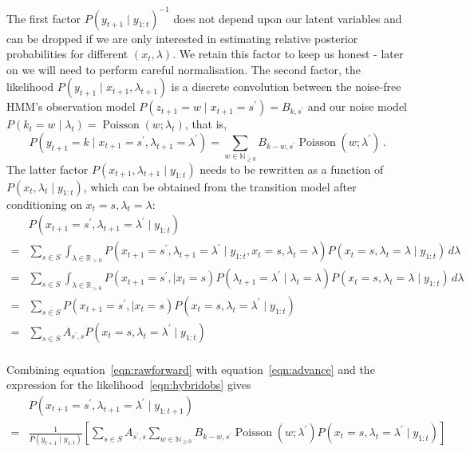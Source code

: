\documentclass[twoside, 11pt]{article}
\DeclareMathOperator*{\poissond}{Poisson}
\newcommand{\reals}[0] {\mathbb{R}}
\newcommand{\nonnegint}[0] {\mathbb{N}_{\geq 0}}
\begin{document}
The first factor $P(y_{t+1} \mid y_{1:t})^{-1}$ does not depend upon our latent variables and can be dropped if we are only interested in estimating relative posterior probabilities for different $(x_t, \lambda)$. We retain this factor to keep us honest - later on we will need to perform careful normalisation. The second factor, the likelihood $P(y_{t+1} \mid x_{t+1}, \lambda_{t+1})$ is a discrete convolution between the noise-free HMM's observation model $P(z_{t+1}=w \mid x_{t+1}=s^{\prime}) = B_{k,s^{\prime}}$ and our noise model $P(k_t=w \mid \lambda_t) = \poissond(w ; \lambda_t)$, that is,
\begin{equation}
P(y_{t+1}=k \mid x_{t+1}=s^{\prime}, \lambda_{t+1}=\lambda^{\prime})
=
\sum_{w \in \nonnegint} B_{k-w,s^{\prime}} \poissond(w ; \lambda^{\prime}) \, \label{eqn:hybridobs} .
\end{equation}
The latter factor $P(x_{t+1}, \lambda_{t+1} \mid y_{1:t})$ needs to be rewritten as a function of $P(x_{t}, \lambda_{t} \mid y_{1:t})$, which can be obtained from the transition model after conditioning on $x_t=s, \lambda_t=\lambda$:
\begin{align}
& P(x_{t+1}=s^{\prime}, \lambda_{t+1}=\lambda^{\prime} \mid y_{1:t}) \nonumber \\
= & \sum_{s \in S} \int_{\lambda \in \reals_{>0}}
P(x_{t+1}=s^{\prime}, \lambda_{t+1}=\lambda^{\prime} \mid y_{1:t}, x_t=s, \lambda_t=\lambda ) P(x_t=s, \lambda_t=\lambda \mid y_{1:t} ) \,d\lambda \nonumber \\
= & \sum_{s \in S} \int_{\lambda \in \reals_{>0}}
P(x_{t+1}=s^{\prime}, \mid x_t=s)
P(\lambda_{t+1}=\lambda^{\prime} \mid \lambda_t=\lambda ) P(x_t=s, \lambda_t=\lambda \mid y_{1:t} ) \,d\lambda \nonumber \\
= & \sum_{s \in S}
P(x_{t+1}=s^{\prime}, \mid x_t=s)
P(x_t=s, \lambda_t=\lambda^{\prime} \mid y_{1:t} ) \nonumber \\
= & \sum_{s \in S}
A_{s^{\prime}, s}
P(x_t=s, \lambda_t=\lambda^{\prime} \mid y_{1:t} ) \nonumber \\
\label{eqn:advance}
\end{align}

Combining equation~\ref{eqn:rawforward} with equation~\ref{eqn:advance} and the expression for the likelihood~\ref{eqn:hybridobs} gives
\begin{align}
& P(x_{t+1}=s^{\prime}, \lambda_{t+1}=\lambda^{\prime} \mid y_{1:{t+1}}) \nonumber \\
= &
\frac{1}{P(y_{t+1} \mid y_{1:t})}
\left[
\sum_{s \in S}
A_{s^{\prime}, s}
\sum_{w \in \nonnegint}
B_{k-w,s^{\prime}} \poissond(w ; \lambda^{\prime})
P(x_t=s, \lambda_t=\lambda^{\prime} \mid y_{1:t} )
\right] \label{eqn:exactfwdupdate}
\end{align}
\end{document}
